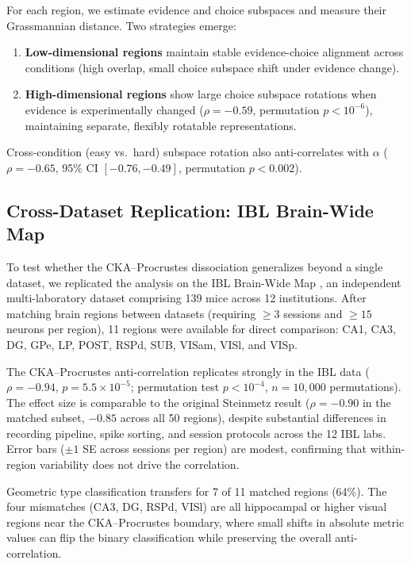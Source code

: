 \documentclass{article}
\begin{document}
For each region, we estimate evidence and choice subspaces and measure their Grassmannian distance. Two strategies emerge:

\begin{enumerate}
\item \textbf{Low-dimensional regions} maintain stable evidence-choice alignment across conditions (high overlap, small choice subspace shift under evidence change).
\item \textbf{High-dimensional regions} show large choice subspace rotations when evidence is experimentally changed ($\rho = -0.59$, permutation $p < 10^{-6}$), maintaining separate, flexibly rotatable representations.
\end{enumerate}

Cross-condition (easy vs.\ hard) subspace rotation also anti-correlates with $\alpha$ ($\rho = -0.65$, 95\% CI $[-0.76, -0.49]$, permutation $p < 0.002$).

\subsection{Cross-Dataset Replication: IBL Brain-Wide Map}
\label{sec:ibl}

To test whether the CKA--Procrustes dissociation generalizes beyond a single dataset, we replicated the analysis on the IBL Brain-Wide Map \citep{ibl2025brainwide}, an independent multi-laboratory dataset comprising 139 mice across 12 institutions. After matching brain regions between datasets (requiring $\geq 3$ sessions and $\geq 15$ neurons per region), 11 regions were available for direct comparison: CA1, CA3, DG, GPe, LP, POST, RSPd, SUB, VISam, VISl, and VISp.

The CKA--Procrustes anti-correlation replicates strongly in the IBL data ($\rho = -0.94$, $p = 5.5 \times 10^{-5}$; permutation test $p < 10^{-4}$, $n = 10{,}000$ permutations). The effect size is comparable to the original Steinmetz result ($\rho = -0.90$ in the matched subset, $-0.85$ across all 50 regions), despite substantial differences in recording pipeline, spike sorting, and session protocols across the 12 IBL labs. Error bars ($\pm 1$ SE across sessions per region) are modest, confirming that within-region variability does not drive the correlation.

Geometric type classification transfers for 7 of 11 matched regions (64\%). The four mismatches (CA3, DG, RSPd, VISl) are all hippocampal or higher visual regions near the CKA--Procrustes boundary, where small shifts in absolute metric values can flip the binary classification while preserving the overall anti-correlation.
\end{document}
